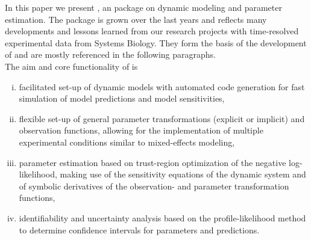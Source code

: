 \documentclass[article]{jss}
\begin{document}
In this paper we present , an  package on dynamic modeling and parameter estimation. 
The package is grown over the last years and reflects many developments and lessons learned from our research projects with time-resolved experimental data from Systems Biology. They form the basis of the development of  and are mostly referenced in the following paragraphs.\\
The aim and core functionality of  is
\begin{enumerate}[(i)]
	\item facilitated set-up of dynamic models with automated  code generation for fast simulation of model predictions and model sensitivities,
	\item flexible set-up of general parameter transformations (explicit or implicit) and observation functions, allowing for the implementation of multiple experimental conditions similar to mixed-effects modeling,
	\item parameter estimation based on trust-region optimization of the negative log-likelihood, making use of the sensitivity equations of the dynamic system and of symbolic derivatives of the observation- and parameter transformation functions,
	\item identifiability and uncertainty analysis based on the profile-likelihood method to determine confidence intervals for parameters and predictions.
\end{enumerate}
\end{document}
